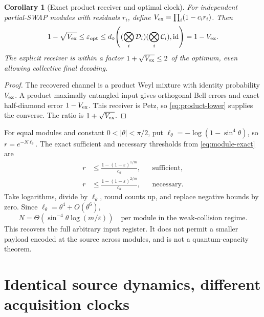 \documentclass[11pt]{article}
\numberwithin{equation}{section}
\newtheorem{corollary}[theorem]{Corollary}
\theoremstyle{remark}
\newcommand{\id}{\operatorname{id}}
\newcommand{\Ccal}{\mathcal C}
\newcommand{\Dcal}{\mathcal D}
\newcommand{\eps}{\varepsilon}
\begin{document}
\begin{corollary}[Exact product receiver and optimal clock]
\label{cor:module-exact}
For independent partial-SWAP modules with residuals \(r_i\), define
\(V_{\rm ex}=\prod_i(1-c_i r_i)\). Then
\begin{equation}
 1-\sqrt{V_{\rm ex}}\le\eps_{\rm opt}\le
 d_\diamond\!\left((\bigotimes_i\Dcal_i)
                   (\bigotimes_i\Ccal_i),\id\right)=1-V_{\rm ex}.
 \label{eq:module-exact}
\end{equation}
The explicit receiver is within a factor \(1+\sqrt{V_{\rm ex}}\le2\) of
the optimum, even allowing collective final decoding.
\end{corollary}
\begin{proof}
The recovered channel is a product Weyl mixture with identity probability
\(V_{\rm ex}\). A product maximally entangled input gives orthogonal Bell
errors and exact half-diamond error \(1-V_{\rm ex}\). This receiver is Petz,
so \eqref{eq:product-lower} supplies the converse. The ratio is
\(1+\sqrt{V_{\rm ex}}\).
\end{proof}

For equal modules and constant \(0<|\theta|<\pi/2\), put
\(\ell_\theta=-\log(1-\sin^4\theta)\), so \(r=e^{-N\ell_\theta}\).
The exact sufficient and necessary thresholds from
\eqref{eq:module-exact} are
\begin{align}
 r&\le\frac{1-(1-\eps)^{1/m}}{c_d},
       &&\text{sufficient},\\
 r&\le\frac{1-(1-\eps)^{2/m}}{c_d},
       &&\text{necessary}.
 \label{eq:exact-count-thresholds}
\end{align}
Take logarithms, divide by \(\ell_\theta\), round counts up, and replace
negative bounds by zero. Since \(\ell_\theta=\theta^4+O(\theta^6)\),
\begin{equation}
 N=\Theta\!\left(\sin^{-4}\theta\log(m/\eps)\right)
 \quad\text{per module in the weak-collision regime}.
 \label{eq:optimal-clock}
\end{equation}
This recovers the full arbitrary input register. It does not permit a
smaller payload encoded at the source across modules, and is not a
quantum-capacity theorem.

\section{Identical source dynamics, different acquisition clocks}
\label{sec:clocks}
\end{document}
